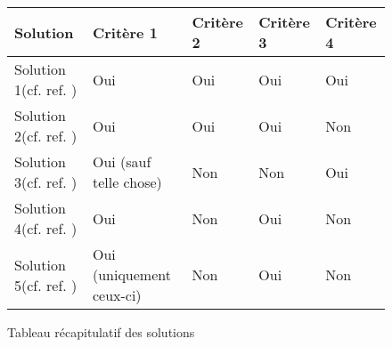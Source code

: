 \begin{figure}[!h]
\begin{center}
\begin{tabular}{|l|l|l|l|l|}
  \hline
  Solution & Critère 1 & Critère 2 & Critère 3 & Critère 4\\
  \hline
  Solution 1(cf. ref. \cite{cite0}) & Oui & Oui & Oui & Oui \\
  Solution 2(cf. ref. \cite{cite1}) & Oui & Oui & Oui & Non \\
  Solution 3(cf. ref. \cite{cite2}) & Oui (sauf telle chose) & Non & Non & Oui\\
  Solution 4(cf. ref. \cite{cite3}) & Oui& Non & Oui & Non\\
  Solution 5(cf. ref. \cite{cite4}) & Oui (uniquement ceux-ci) & Non & Oui & Non\\
  \hline
\end{tabular}
\end{center}
\caption{Tableau récapitulatif des solutions}
\end{figure}

